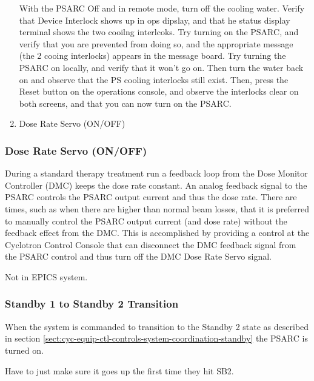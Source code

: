 \documentclass[11pt]{book}		%
\begin{document}
\begin{enumerate}
\color{red}

With the PSARC Off and in remote mode, turn off the cooling water. Verify that Device Interlock shows up in ops dipslay, and that he status display terminal shows the two cooilng interlcoks. Try turning on the PSARC, and verify that you are prevented from doing so, and the appropriate message (the 2 cooing interlocks) appears in the message board. Try turning the PSARC on locally, and verify that it won't go on. Then turn the water back on and observe that the PS cooling interlocks still exist. Then, press the Reset button on the operations console, and observe the interlocks clear on both screens, and that you can now turn on the PSARC.

\color{black}


 \item Dose Rate Servo (ON/OFF)
\end{enumerate}

\subsubsection{Dose Rate Servo (ON/OFF)}

During a standard therapy treatment run a feedback loop from the Dose Monitor Controller (DMC) keeps the dose rate constant.  An analog feedback signal to the PSARC controls the PSARC output current and thus the dose rate.  There are times, such as when there are higher than normal beam losses, that it is preferred to manually control the PSARC output current (and dose rate) without the feedback effect from the DMC.  This is accomplished by providing a control at the Cyclotron Control Console that can disconnect the DMC feedback signal from the PSARC control and thus turn off the DMC Dose Rate Servo signal.

\color{red}

Not in EPICS system.

\color{black}


\subsubsection{Standby 1 to Standby 2 Transition}

When the system is commanded to transition to the Standby 2 state as described in section \ref{sect:cyc-equip-ctl-controls-system-coordination-standby} the PSARC is turned on.

\color{red}

Have to just make sure it goes up the first time they hit SB2.
\end{document}
